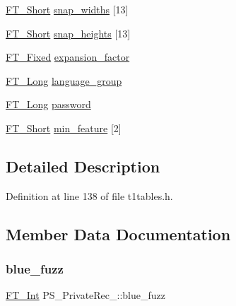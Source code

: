 \begin{DoxyCompactItemize}
\item 
\mbox{\hyperlink{fttypes_8h_aa7279be89046a2563cd3d4d6651fbdcf}{F\+T\+\_\+\+Short}} \mbox{\hyperlink{struct_p_s___private_rec___a39cf1a4b21280bf8082ccba0f4824a8a}{snap\+\_\+widths}} \mbox{[}13\mbox{]}
\item 
\mbox{\hyperlink{fttypes_8h_aa7279be89046a2563cd3d4d6651fbdcf}{F\+T\+\_\+\+Short}} \mbox{\hyperlink{struct_p_s___private_rec___a3583caf0cc05de2afac098574ed0bc4b}{snap\+\_\+heights}} \mbox{[}13\mbox{]}
\item 
\mbox{\hyperlink{fttypes_8h_a5f5a679cc09f758efdd0d1c5feed3c3d}{F\+T\+\_\+\+Fixed}} \mbox{\hyperlink{struct_p_s___private_rec___a45cf6e07c4c26f029e66998e6cad9fa0}{expansion\+\_\+factor}}
\item 
\mbox{\hyperlink{fttypes_8h_a7fa72a1f0e79fb1860c5965789024d6f}{F\+T\+\_\+\+Long}} \mbox{\hyperlink{struct_p_s___private_rec___afc2a7f950a174577ebfc062bb1598f5c}{language\+\_\+group}}
\item 
\mbox{\hyperlink{fttypes_8h_a7fa72a1f0e79fb1860c5965789024d6f}{F\+T\+\_\+\+Long}} \mbox{\hyperlink{struct_p_s___private_rec___a309a871cdeb6f658d8fbff23fa13b667}{password}}
\item 
\mbox{\hyperlink{fttypes_8h_aa7279be89046a2563cd3d4d6651fbdcf}{F\+T\+\_\+\+Short}} \mbox{\hyperlink{struct_p_s___private_rec___af8c829e03c424b1f12b2c9cd4041a868}{min\+\_\+feature}} \mbox{[}2\mbox{]}
\end{DoxyCompactItemize}


\subsection{Detailed Description}


Definition at line 138 of file t1tables.\+h.



\subsection{Member Data Documentation}
\mbox{\label{struct_p_s___private_rec___a21fbb2665f25cd0d769d023ca8063319}} 
\subsubsection{\texorpdfstring{blue\_fuzz}{blue\_fuzz}}
{\footnotesize\ttfamily \mbox{\hyperlink{fttypes_8h_af90e5fb0d07e21be9fe6faa33f02484c}{F\+T\+\_\+\+Int}} P\+S\+\_\+\+Private\+Rec\+\_\+\+::blue\+\_\+fuzz}



